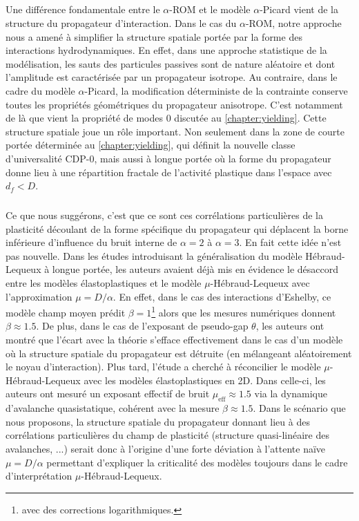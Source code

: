 \subparagraph{}Une différence fondamentale entre le $\alpha$-ROM et le modèle $\alpha$-Picard vient de la structure du propagateur d'interaction. Dans le cas du $\alpha$-ROM, notre approche nous a amené à simplifier la structure spatiale portée par la forme des interactions hydrodynamiques. En effet, dans une approche statistique de la modélisation, les sauts des particules passives sont de nature aléatoire et dont l'amplitude est caractérisée par un propagateur isotrope. Au contraire, dans le cadre du modèle $\alpha$-Picard, la modification déterministe de la contrainte conserve toutes les propriétés géométriques du propagateur anisotrope. C'est notamment de là que vient la propriété de modes 0 discutée au \autoref{chapter:yielding}. Cette structure spatiale joue un rôle important. Non seulement dans la zone de courte portée déterminée au \autoref{chapter:yielding}, qui définit la nouvelle classe d'universalité CDP-0, mais aussi à longue portée où la forme du propagateur donne lieu à une répartition fractale de l'activité plastique dans l'espace avec $d_f < D$.

\subparagraph{}Ce que nous suggérons, c'est que ce sont ces corrélations particulières de la plasticité découlant de la forme spécifique du propagateur qui déplacent la borne inférieure d’influence du bruit interne de $\alpha = 2$ à $\alpha = 3$. En fait cette idée n'est pas nouvelle. Dans les études \cite{lin_mean-field_2016, lin_microscopic_2018} introduisant la généralisation du modèle Hébraud-Lequeux à longue portée, les auteurs avaient déjà mis en évidence le désaccord entre les modèles élastoplastiques et le modèle $\mu$-Hébraud-Lequeux avec l'approximation $\mu = D/\alpha$. En effet, dans le cas des interactions d'Eshelby, ce modèle champ moyen prédit $\beta = 1$\footnote{avec des corrections logarithmiques.} alors que les mesures numériques donnent $\beta \approx 1.5$. De plus, dans le cas de l'exposant de pseudo-gap $\theta$, les auteurs ont montré que l'écart avec la théorie s'efface effectivement dans le cas d'un modèle où la structure spatiale du propagateur est détruite (en mélangeant aléatoirement le noyau d'interaction). Plus tard, l'étude \cite{ferrero_criticality_2019} a cherché à réconcilier le modèle $\mu$-Hébraud-Lequeux avec les modèles élastoplastiques en 2D. Dans celle-ci, les auteurs ont mesuré un exposant effectif de bruit $\mu_\text{eff}\approx 1.5$ via la dynamique d'avalanche quasistatique, cohérent avec la mesure $\beta \approx 1.5$. Dans le scénario que nous proposons, la structure spatiale du propagateur donnant lieu à des corrélations particulières du champ de plasticité (structure quasi-linéaire des avalanches, ...) serait donc à l'origine d'une forte déviation à l'attente naïve $\mu = D/\alpha$ permettant d'expliquer la criticalité des modèles toujours dans le cadre d'interprétation $\mu$-Hébraud-Lequeux.

